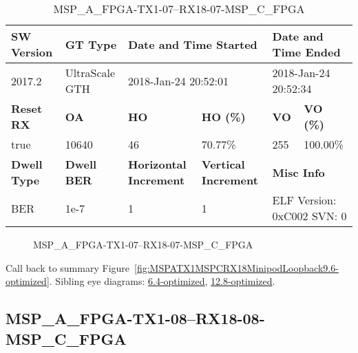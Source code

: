 \begin{table}[h]
\centering
\caption{MSP\_A\_FPGA-TX1-07--RX18-07-MSP\_C\_FPGA}
\label{tab:MSPAFPGATX107RX1807MSPCFPGA9.6-optimized}
\begin{tabular}{@{}|l|l|l|l|l|l|@{}}
\toprule
\textbf{SW Version}                & \textbf{GT Type}   & \multicolumn{2}{l|}{\textbf{Date and Time Started}}            & \multicolumn{2}{l|}{\textbf{Date and Time Ended}}        \\ \midrule
2017.2                       & UltraScale GTH          & \multicolumn{2}{l|}{2018-Jan-24 20:52:01}                   & \multicolumn{2}{l|}{2018-Jan-24 20:52:34}               \\ \midrule
\textbf{Reset RX}                  & \textbf{OA} & \textbf{HO}   & \textbf{HO (\%)} & \textbf{VO} & \textbf{VO (\%)} \\ \midrule
true & 10640        & 46          & 70.77\%        & 255        & 100.00\%       \\ \midrule
\textbf{Dwell Type}                & \textbf{Dwell BER} & \textbf{Horizontal Increment} & \textbf{Vertical Increment}    & \multicolumn{2}{l|}{\textbf{Misc Info}}                  \\ \midrule
BER                            & 1e-7        & 1        & 1           & \multicolumn{2}{l|}{ELF Version: 0xC002 SVN: 0}                         \\ \bottomrule
\end{tabular}
\end{table}

\begin{figure}[h]
\caption{MSP\_A\_FPGA-TX1-07--RX18-07-MSP\_C\_FPGA} \label{fig:MSPAFPGATX107RX1807MSPCFPGA9.6-optimized}
\end{figure}

Call back to summary Figure~\ref{fig:MSPATX1MSPCRX18MinipodLoopback9.6-optimized}.
Sibling eye diagrams: \hyperref[sec:MSPAFPGATX107RX1807MSPCFPGA6.4-optimized]{6.4-optimized}, \hyperref[sec:MSPAFPGATX107RX1807MSPCFPGA12.8-optimized]{12.8-optimized}.

\clearpage
\newpage


\subsection{MSP\_A\_FPGA-TX1-08--RX18-08-MSP\_C\_FPGA}\label{sec:MSPAFPGATX108RX1808MSPCFPGA9.6-optimized}

